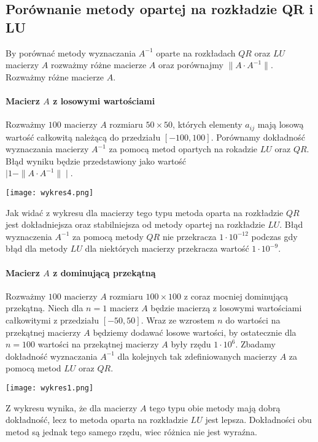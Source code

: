 \documentclass[11pt]{article}
\begin{document}
\subsection{Porównanie metody opartej na rozkładzie QR i LU}

By porównać metody wyznaczania $A^{-1}$ oparte na rozkładach $QR$ oraz $LU$ macierzy $A$ rozważmy różne macierze $A$ oraz porównajmy $ \| A \cdot A^{-1} \|$. Rozważmy różne macierze $A$.

\paragraph{Macierz $A$ z losowymi wartościami}
Rozważmy $100$ macierzy $A$ rozmiaru $50 \times 50$, których elementy $a_{ij}$ mają losową wartość całkowitą należącą do przedziału $[-100,100]$. Porównamy dokładność wyznaczania macierzy $A^{-1}$ za pomocą metod opartych na rokadzie $LU$ oraz $QR$. Błąd wyniku będzie przedstawiony jako wartość\\ $ \mid 1 - \| A \cdot A^{-1} \| \mid $.

\begin{center}
\texttt{[image: wykres4.png]}
\end{center}
Jak widać z wykresu dla macierzy tego typu metoda oparta na rozkładzie $QR$ jest dokładniejsza oraz stabilniejsza od metody opartej na rozkładzie $LU$. Błąd wyznaczenia $A^{-1}$ za pomocą metody $QR$ nie przekracza $1 \cdot 10^{-12}$ podczas gdy błąd dla metody $LU$ dla niektórych macierzy przekracza wartość $1 \cdot 10^{-9}$. 

\paragraph{Macierz $A$ z dominującą przekątną}

Rozważmy $100$ macierzy $A$ rozmiaru $100 \times 100$ z coraz mocniej dominującą przekątną. Niech dla $n=1$ macierz $A$ będzie macierzą z losowymi wartościami całkowitymi z przedziału $[-50,50]$. Wraz ze wzrostem $n$ do wartości na przekątnej macierzy $A$ będziemy dodawać losowe wartości, by ostatecznie dla $n=100$ wartości na przekątnej macierzy $A$ były rzędu $1 \cdot 10^{6}$. Zbadamy dokładność wyznaczania $A^{-1}$ dla kolejnych tak zdefiniowanych macierzy $A$ za pomocą metod $LU$ oraz $QR$.

\begin{center}
\texttt{[image: wykres1.png]}
\end{center}
Z wykresu wynika, że dla macierzy $A$ tego typu obie metody mają dobrą dokładność, lecz to metoda oparta na rozkładzie $LU$ jest lepsza. Dokładności obu metod są jednak tego samego rzędu, wiec różnica nie jest wyraźna. 
\end{document}
